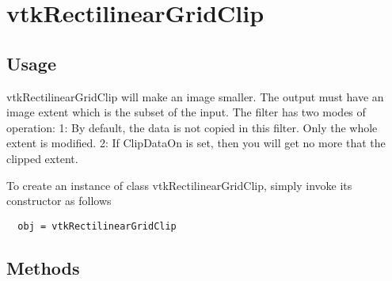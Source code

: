 \section{vtkRectilinearGridClip}

\subsection{Usage}

 vtkRectilinearGridClip  will make an image smaller.  The output must have
 an image extent which is the subset of the input.  The filter has two 
 modes of operation: 
 1: By default, the data is not copied in this filter. 
 Only the whole extent is modified.  
 2: If ClipDataOn is set, then you will get no more that the clipped
 extent.

To create an instance of class vtkRectilinearGridClip, simply
invoke its constructor as follows
\begin{verbatim}
  obj = vtkRectilinearGridClip
\end{verbatim}
\subsection{Methods}

